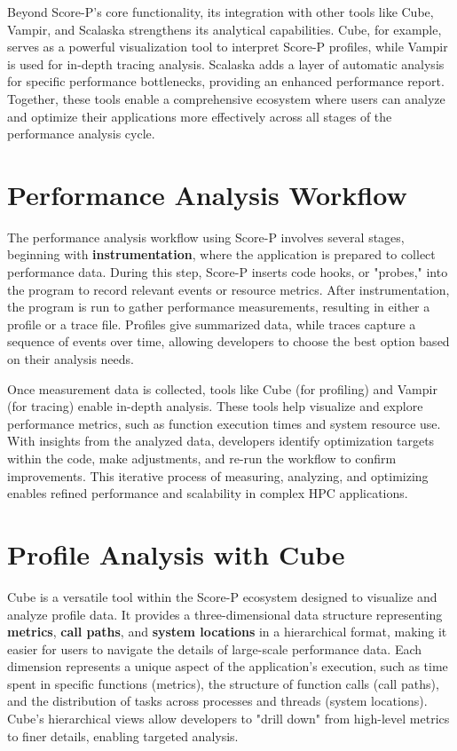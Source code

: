 \documentclass[conference]{IEEEtran}
\begin{document}
Beyond Score-P’s core functionality, its integration with other tools like Cube, Vampir, and Scalaska strengthens its analytical capabilities. Cube, for example, serves as a powerful visualization tool to interpret Score-P profiles, while Vampir is used for in-depth tracing analysis. Scalaska adds a layer of automatic analysis for specific performance bottlenecks, providing an enhanced performance report. Together, these tools enable a comprehensive ecosystem where users can analyze and optimize their applications more effectively across all stages of the performance analysis cycle.


\section*{Performance Analysis Workflow}

The performance analysis workflow using Score-P involves several stages, beginning with \textbf{instrumentation}, where the application is prepared to collect performance data. During this step, Score-P inserts code hooks, or "probes," into the program to record relevant events or resource metrics. After instrumentation, the program is run to gather performance measurements, resulting in either a profile or a trace file. Profiles give summarized data, while traces capture a sequence of events over time, allowing developers to choose the best option based on their analysis needs.

Once measurement data is collected, tools like Cube (for profiling) and Vampir (for tracing) enable in-depth analysis. These tools help visualize and explore performance metrics, such as function execution times and system resource use. With insights from the analyzed data, developers identify optimization targets within the code, make adjustments, and re-run the workflow to confirm improvements. This iterative process of measuring, analyzing, and optimizing enables refined performance and scalability in complex HPC applications.

\section{Profile Analysis with Cube}

Cube is a versatile tool within the Score-P ecosystem designed to visualize and analyze profile data. It provides a three-dimensional data structure representing \textbf{metrics}, \textbf{call paths}, and \textbf{system locations} in a hierarchical format, making it easier for users to navigate the details of large-scale performance data. Each dimension represents a unique aspect of the application's execution, such as time spent in specific functions (metrics), the structure of function calls (call paths), and the distribution of tasks across processes and threads (system locations). Cube’s hierarchical views allow developers to "drill down" from high-level metrics to finer details, enabling targeted analysis.
\end{document}
